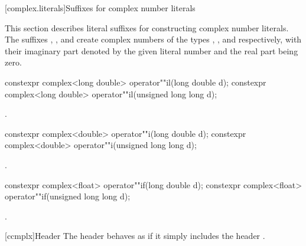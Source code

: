 [complex.literals]{Suffixes for complex number literals}

%
%
\pnum
This section describes literal suffixes for constructing complex number literals.
The suffixes , , and  create complex numbers of
the types , , and
 respectively, with their imaginary part denoted by the
given literal number and the real part being zero.

\begin{itemdecl}
constexpr complex<long double> operator""il(long double d);
constexpr complex<long double> operator""il(unsigned long long d);
\end{itemdecl}

\begin{itemdescr}
\pnum
\returns
{}.
\end{itemdescr}

\begin{itemdecl}
constexpr complex<double> operator""i(long double d);
constexpr complex<double> operator""i(unsigned long long d);
\end{itemdecl}

\begin{itemdescr}
\pnum
\returns
{}.
\end{itemdescr}

\begin{itemdecl}
constexpr complex<float> operator""if(long double d);
constexpr complex<float> operator""if(unsigned long long d);
\end{itemdecl}

\begin{itemdescr}
\pnum
\returns
{}.
\end{itemdescr}

[ccmplx]{Header }
\pnum
{}%
The header behaves as if it simply includes the header .



